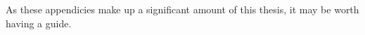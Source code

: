 \documentclass[12pt, a4paper, twoside, openright]{book}
\begin{document}









% 








% 


\appendix
\newpage

As these appendicies make up a significant amount of this thesis, it may be worth
having a guide.
\end{document}

